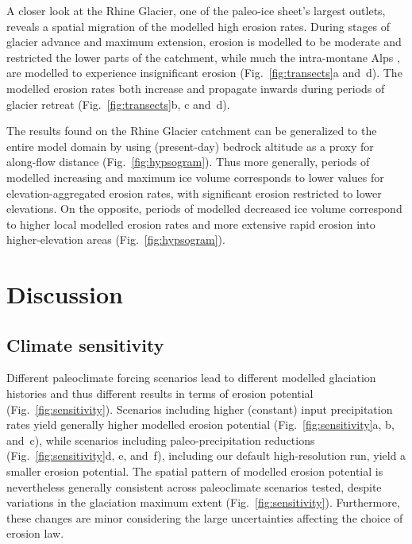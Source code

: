\documentclass[utf8]{article}
\begin{document}
    A closer look at the Rhine Glacier, one of the paleo-ice sheet's largest
    outlets, reveals a spatial migration of the modelled high erosion rates.
    During stages of glacier advance and maximum extension, erosion is modelled
    to be moderate and restricted the lower parts of the catchment, while much
    the intra-montane Alps \citep[modelled to be largely
    cold-based,][Fig.~6c]{Seguinot.etal.2018}, are modelled to experience
    insignificant erosion (Fig.~\ref{fig:transects}a and~d). The modelled
    erosion rates both increase and propagate inwards during periods of glacier
    retreat (Fig.~\ref{fig:transects}b, c and~d).

    The results found on the Rhine Glacier catchment can be generalized to the
    entire model domain by using (present-day) bedrock altitude as a proxy for
    along-flow distance (Fig.~\ref{fig:hypsogram}). Thus more generally,
    periods of modelled increasing and maximum ice volume corresponds to lower
    values for elevation-aggregated erosion rates, with significant erosion
    restricted to lower elevations. On the opposite, periods of modelled
    decreased ice volume correspond to higher local modelled erosion rates and
    more extensive rapid erosion into higher-elevation areas
    (Fig.~\ref{fig:hypsogram}).


\section{Discussion}

\subsection{Climate sensitivity}
\label{sec:sensitivity}

    Different paleoclimate forcing scenarios lead to different modelled
    glaciation histories and thus different results in terms of erosion
    potential (Fig.~\ref{fig:sensitivity}). Scenarios including higher
    (constant) input precipitation rates yield generally higher modelled
    erosion potential (Fig.~\ref{fig:sensitivity}a, b, and~c), while scenarios
    including paleo-precipitation reductions (Fig.~\ref{fig:sensitivity}d, e,
    and~f), including our default high-resolution run, yield a smaller erosion
    potential. The spatial pattern of modelled erosion potential is
    nevertheless generally consistent across paleoclimate scenarios tested,
    despite variations in the glaciation maximum extent
    (Fig.~\ref{fig:sensitivity}). Furthermore, these changes are minor
    considering the large uncertainties affecting the choice of erosion law.
\end{document}
